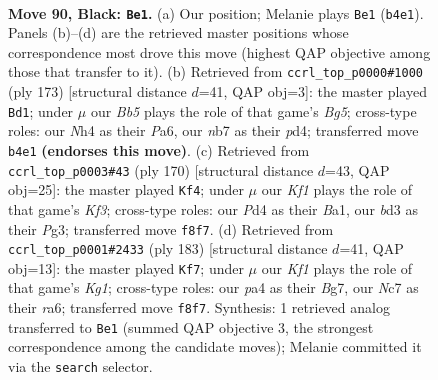 \documentclass[11pt]{article}
\begin{document}
\clearpage

\begin{figure}[p]\centering
\begin{subfigure}{0.46\textwidth}\centering
\resizebox{\linewidth}{!}{%
\newchessgame
\chessboard[
  setfen={5k2/1Nn5/8/p7/Pb1pP2n/1P1B3p/1K2P3/8 b - - 47 90},
  showmover=false,
  pgfstyle=straightmove, color=movearrow, markmove={b4-e1}
]}
\caption{}
\end{subfigure}\hfill
\begin{subfigure}{0.46\textwidth}\centering
\resizebox{\linewidth}{!}{%
\newchessgame
\chessboard[
  setfen={8/1p6/pB6/P2k3p/3P2bP/4K1P1/8/8 b - - 8 87},
  showmover=false,
  pgfstyle=straightmove, color=movearrow, markmove={g4-d1}
]}
\caption{}
\end{subfigure}
\\[4pt]
\begin{subfigure}{0.46\textwidth}\centering
\resizebox{\linewidth}{!}{%
\newchessgame
\chessboard[
  setfen={5k2/1B3p2/Pb4p1/2p1P2p/2b4P/5KP1/8/B7 w - - 47 86},
  showmover=false,
  pgfstyle=straightmove, color=movearrow, markmove={f3-f4}
]}
\caption{}
\end{subfigure}\hfill
\begin{subfigure}{0.46\textwidth}\centering
\resizebox{\linewidth}{!}{%
\newchessgame
\chessboard[
  setfen={6k1/6b1/R5p1/5pPp/1r3P1P/4B3/5PK1/8 b - - 48 92},
  showmover=false,
  pgfstyle=straightmove, color=movearrow, markmove={g8-f7}
]}
\caption{}
\end{subfigure}
\caption{\textbf{Move 90, Black: \texttt{Be1}.} (a) Our position; Melanie plays \texttt{Be1} (\texttt{b4e1}). Panels (b)--(d) are the retrieved master positions whose correspondence most drove this move (highest QAP objective among those that transfer to it). (b) Retrieved from \texttt{ccrl\_top\_p0000\#1000} (ply 173) [structural distance $d$=41, QAP obj=3]: the master played \texttt{Bd1}; under $\mu$ our \emph{Bb5} plays the role of that game's \emph{Bg5}; cross-type roles: our \emph{N}h4 as their \emph{P}a6, our \emph{n}b7 as their \emph{p}d4; transferred move \texttt{b4e1} \textbf{(endorses this move)}. (c) Retrieved from \texttt{ccrl\_top\_p0003\#43} (ply 170) [structural distance $d$=43, QAP obj=25]: the master played \texttt{Kf4}; under $\mu$ our \emph{Kf1} plays the role of that game's \emph{Kf3}; cross-type roles: our \emph{P}d4 as their \emph{B}a1, our \emph{b}d3 as their \emph{P}g3; transferred move \texttt{f8f7}. (d) Retrieved from \texttt{ccrl\_top\_p0001\#2433} (ply 183) [structural distance $d$=41, QAP obj=13]: the master played \texttt{Kf7}; under $\mu$ our \emph{Kf1} plays the role of that game's \emph{Kg1}; cross-type roles: our \emph{p}a4 as their \emph{B}g7, our \emph{N}c7 as their \emph{r}a6; transferred move \texttt{f8f7}. Synthesis: 1 retrieved analog transferred to \texttt{Be1} (summed QAP objective 3, the strongest correspondence among the candidate moves); Melanie committed it via the \texttt{search} selector.}
\label{fig:thought-m179}
\end{figure}
\end{document}
